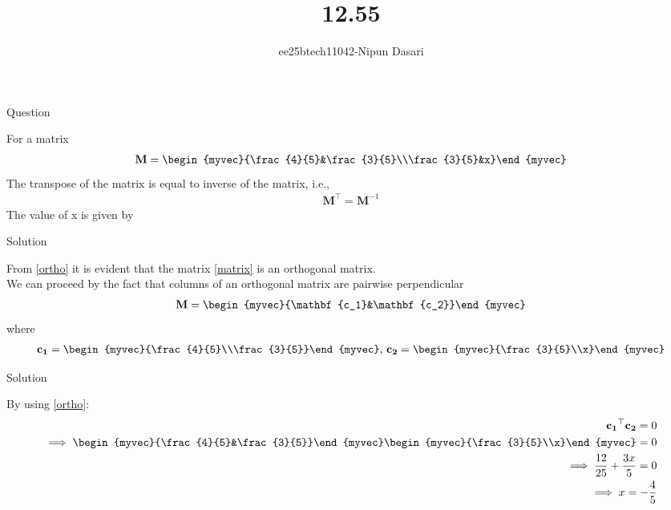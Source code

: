 \documentclass{beamer}
\title{12.55}
\author{ee25btech11042-Nipun Dasari}
\numberwithin{equation}{section}
\theoremstyle{remark}
\let\vec\mathbf
\begin{document}
	
	\begin{frame}
		\titlepage
	\end{frame}
	
	\begin{frame}{Question}
		
		For a matrix \\
	\begin{align}
		\vec{M}=\begin{myvec}{\frac{4}{5}&\frac{3}{5}\\\frac{3}{5}&x}\end{myvec} \label{matrix}
	\end{align}
	The transpose of the matrix is equal to inverse of the matrix, i.e., 
	\begin{align}
		\vec{M}^\top = \vec{M}^{-1} \label{ortho}
	\end{align}
	The value of x is given by
		
	\end{frame}
	
	
	
	\begin{frame}{Solution}
		
			From \eqref{ortho} it is evident that the matrix \eqref{matrix} is an orthogonal matrix.\\
		We can proceed by the fact that columns of an orthogonal matrix are pairwise perpendicular
		\begin{align}
			\vec{M} = \begin{myvec}{\vec{c_1}&\vec{c_2}}\end{myvec}
		\end{align} 
		where
		\begin{align}
			\vec{c_1} = \begin{myvec}{\frac{4}{5}\\\frac{3}{5}}\end{myvec}\text{, }\vec{c_2} = \begin{myvec}{\frac{3}{5}\\x}\end{myvec}
		\end{align}
		
		
	\end{frame}
	
	\begin{frame}{Solution}
		
		
	By using \eqref{ortho}:
	\begin{align}
		\vec{c_1}^\top\vec{c_2} = 0\\
		\implies \begin{myvec}{\frac{4}{5}&\frac{3}{5}}\end{myvec}\begin{myvec}{\frac{3}{5}\\x}\end{myvec} = 0\\
		\implies \frac{12}{25} + \frac{3x}{5} = 0\\
		\implies x = -\frac{4}{5}
	\end{align}
		
	\end{frame}
	
	
		

	
\end{document}
